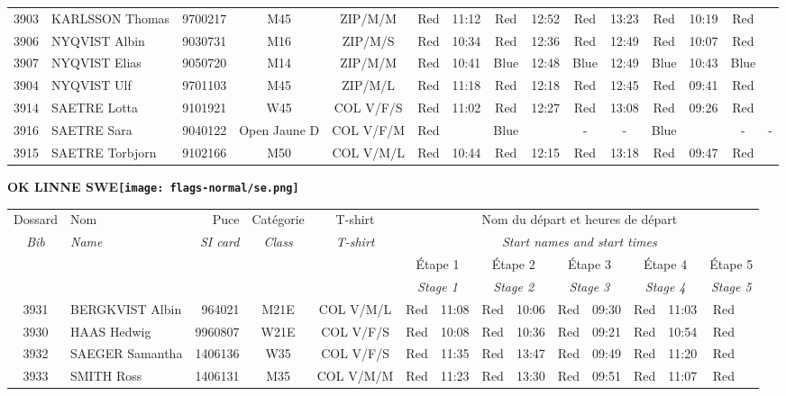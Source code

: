 \documentclass{report}
\begin{document}
\begin{longtable}{|c|l|r|c|c|*{5}{cc|}}
    3903 & KARLSSON Thomas & 9700217 & M45 & ZIP/M/M & Red & 11:12 & Red & 12:52 & Red & 13:23 & Red & 10:19 & Red &  \\
    3906 & NYQVIST Albin & 9030731 & M16 & ZIP/M/S & Red & 10:34 & Red & 12:36 & Red & 12:49 & Red & 10:07 & Red &  \\
    3907 & NYQVIST Elias & 9050720 & M14 & ZIP/M/M & Red & 10:41 & Blue & 12:48 & Blue & 12:49 & Blue & 10:43 & Blue &  \\
    3904 & NYQVIST Ulf & 9701103 & M45 & ZIP/M/L & Red & 11:18 & Red & 12:18 & Red & 12:45 & Red & 09:41 & Red &  \\
    3914 & SAETRE Lotta & 9101921 & W45 & COL V/F/S & Red & 11:02 & Red & 12:27 & Red & 13:08 & Red & 09:26 & Red &  \\
    3916 & SAETRE Sara & 9040122 & Open Jaune D & COL V/F/M & Red &   & Blue &   & - &  - & Blue &   & - &  -\\
    3915 & SAETRE Torbjorn & 9102166 & M50 & COL V/M/L & Red & 10:44 & Red & 12:15 & Red & 13:18 & Red & 09:47 & Red &  \\
  \end{longtable}
\newpage
  \Huge \centering \bfseries OK LINNE  SWE\normalfont \footnotesize \sffamily \hfill \texttt{[image: flags-normal/se.png]} \newline 
  \begin{longtable}{|c|l|r|c|c|*{5}{cc|}}
    Dossard & Nom  & Puce    & Catégorie & T-shirt & \multicolumn{10}{c|}{Nom du départ et heures de départ} \\
    \itshape Bib     & \itshape Name & \itshape SI card & \itshape Class  & \itshape  T-shirt  & \multicolumn{10}{c|}{\itshape Start names and start times} \\
    \hline
    & & & & & \multicolumn{2}{c|}{Étape 1} & \multicolumn{2}{c|}{Étape 2} & \multicolumn{2}{c|}{Étape 3} & \multicolumn{2}{c|}{Étape 4} & \multicolumn{2}{c|}{Étape 5} \\
    & & & & & \multicolumn{2}{c|}{\itshape Stage 1} & \multicolumn{2}{c|}{\itshape Stage 2} & \multicolumn{2}{c|}{\itshape Stage 3} & \multicolumn{2}{c|}{\itshape Stage 4} & \multicolumn{2}{c|}{\itshape Stage 5} \\
    \hline
    3931 & BERGKVIST Albin & 964021 & M21E & COL V/M/L & Red & 11:08 & Red & 10:06 & Red & 09:30 & Red & 11:03 & Red &  \\
    3930 & HAAS Hedwig & 9960807 & W21E & COL V/F/S & Red & 10:08 & Red & 10:36 & Red & 09:21 & Red & 10:54 & Red &  \\
    3932 & SAEGER Samantha & 1406136 & W35 & COL V/F/S & Red & 11:35 & Red & 13:47 & Red & 09:49 & Red & 11:20 & Red &  \\
    3933 & SMITH Ross & 1406131 & M35 & COL V/M/M & Red & 11:23 & Red & 13:30 & Red & 09:51 & Red & 11:07 & Red &  \\
  \end{longtable}
\end{document}
